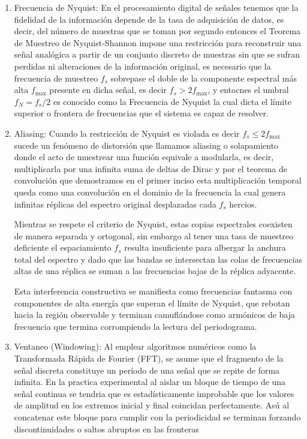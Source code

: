 \begin{enumerate}
    \item Frecuencia de Nyquist: En el procesamiento digital de señales tenemos que la fidelidad de la información depende de la tasa de adquisición de datos, es decir, del número de muestras que se toman por segundo entonces el Teorema de Muestreo de Nyquist-Shannon impone una restricción para reconstruir una señal analógica a partir de un conjunto discreto de muestras sin que se sufran perdidas ni alteraciones de la información original, es necesario que la frecuencia de muestreo $f_s$ sobrepase el doble de la componente espectral más alta $f_{\text{max}}$ presente en dicha señal, es decir $f_s > 2 f_{\text{max}}$, y entocnes el umbral $f_N = f_s / 2$ es conocido como la Frecuencia de Nyquist la cual dicta el límite superior o frontera de frecuencias que el sistema es capaz de resolver.
    
    \item Aliasing: Cuando la restricción de Nyquist es violada es decir $f_s \leq 2 f_{\text{max}}$ sucede un fenómeno de distorsión que llamamos aliasing o solapamiento donde el acto de muestrear una función equivale a modularla, es decir, multiplicarla por una infinita suma de deltas de Dirac y por el teorema de convolución que demostramos en el primer inciso esta multiplicación temporal queda como una convolución en el dominio de la frecuencia la cual genera infinitas réplicas del espectro original desplazadas cada $f_s$ hercios. 
    
    Mientras se respete el criterio de Nyquist, estas copias espectrales coexisten de manera separada y ortogonal, sin embargo al tener una tasa de muestreo deficiente el espaciamiento $f_s$ resulta insuficiente para albergar la anchura total del espectro y dado que las bandas se intersectan las colas de frecuencias altas de una réplica se suman a las frecuencias bajas de la réplica adyacente. 
    
    Esta interferencia constructiva se manifiesta como frecuencias fantasma con componentes de alta energía que superan el límite de Nyquist, que rebotan hacia la región observable y terminan camuflándose como armónicos de baja frecuencia que termina corrompiendo la lectura del periodograma.
    
    \item Ventaneo (Windowing): Al emplear algoritmos numéricos como la Transformada Rápida de Fourier (FFT), se asume que el fragmento de la señal discreta constituye un período de una señal que se repite de forma infinita. En la practica experimental al aislar un bloque de tiempo de una señal continua se tendria que es estadísticamente improbable que los valores de amplitud en los extremos inicial y final coincidan perfectamente. Asú al concatenar este bloque para cumplir con la periodicidad se terminan forzando discontinuidades o saltos abruptos en las fronteras
    

\end{enumerate}
